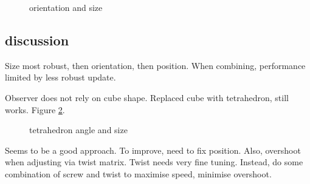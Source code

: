 \begin{figure}
{\begin{minipage}[b]{0.45\columnwidth}
 	\end{minipage}}
 	\caption{orientation and size}
 	\label{fig:orientation_size_update}
\end{figure}

\subsection{discussion}
Size most robust, then orientation, then position. When combining, performance limited by less robust update.

Observer does not rely on cube shape. Replaced cube with tetrahedron, still works. Figure \ref{fig:tetrahedron}.
\begin{figure}
\centering
 	\caption{tetrahedron angle and size}
 	\label{fig:tetrahedron}
\end{figure}

Seems to be a good approach. To improve, need to fix position. Also, overshoot when adjusting via twist matrix. Twist needs very fine tuning. Instead, do some combination of screw and twist to maximise speed, minimise overshoot.
